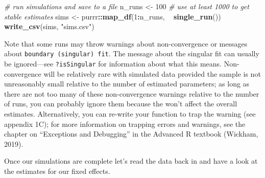 \documentclass[
  english,
  doc,floatsintext]{apa6}
\newenvironment{Shaded}{\begin{snugshade}}{\end{snugshade}}
\newcommand{\CommentTok}[1]{\textcolor[rgb]{0.56,0.35,0.01}{\textit{#1}}}
\newcommand{\DataTypeTok}[1]{\textcolor[rgb]{0.13,0.29,0.53}{#1}}
\newcommand{\DecValTok}[1]{\textcolor[rgb]{0.00,0.00,0.81}{#1}}
\newcommand{\KeywordTok}[1]{\textcolor[rgb]{0.13,0.29,0.53}{\textbf{#1}}}
\newcommand{\NormalTok}[1]{#1}
\newcommand{\OperatorTok}[1]{\textcolor[rgb]{0.81,0.36,0.00}{\textbf{#1}}}
\newcommand{\OtherTok}[1]{\textcolor[rgb]{0.56,0.35,0.01}{#1}}
\newcommand{\StringTok}[1]{\textcolor[rgb]{0.31,0.60,0.02}{#1}}
\begin{document}
\begin{Shaded}
\begin{Highlighting}[]
\CommentTok{# run simulations and save to a file}
\NormalTok{n_runs <-}\StringTok{ }\DecValTok{100} \CommentTok{# use at least 1000 to get stable estimates}
\NormalTok{sims <-}\StringTok{ }\NormalTok{purrr}\OperatorTok{::}\KeywordTok{map_df}\NormalTok{(}\DecValTok{1}\OperatorTok{:}\NormalTok{n_runs, }\OperatorTok{~}\StringTok{ }\KeywordTok{single_run}\NormalTok{())}
\KeywordTok{write_csv}\NormalTok{(sims, }\StringTok{"sims.csv"}\NormalTok{)}
\end{Highlighting}
\end{Shaded}

Note that some runs may throw warnings about non-convergence or messages about \texttt{boundary\ (singular)\ fit}. The message about the singular fit can usually be ignored---see \texttt{?isSingular} for information about what this means. Non-convergence will be relatively rare with simulated data provided the sample is not unreasonably small relative to the number of estimated parameters; as long as there are not too many of these non-convergence warnings relative to the number of runs, you can probably ignore them because the won't affect the overall estimates. Alternatively, you can re-write your function to trap the warning (see appendix 1C); for more information on trapping errors and warnings, see the chapter on \enquote{Exceptions and Debugging} in the Advanced R textbook (Wickham, 2019).

Once our simulations are complete let's read the data back in and have a look at the estimates for our fixed effects.

\begin{Shaded}
\end{Shaded}
\end{document}
